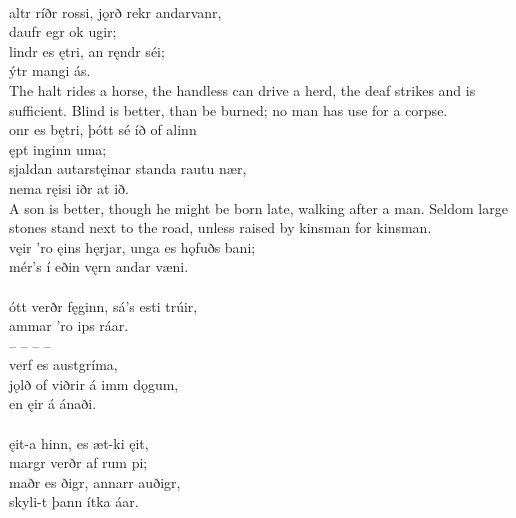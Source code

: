  \\

\bva {}altr ríðr rossi, \hld {}jǫrð rekr andarvanr, \\%
\ind daufr egr ok ugir; \\%
lindr es ętri, \hld an ręndr séi; \\%
\ind {}ýtr mangi ás.\\%

\bvb The halt rides a horse, the handless can drive a herd, the deaf strikes and is sufficient. Blind is better, than be burned; no man has use for a corpse. \\

\bva {}onr es bętri, \hld þótt sé íð of alinn \\%
\ind ępt inginn uma; \\%
sjaldan autarstęinar \hld standa rautu nær, \\%
\ind nema ręisi iðr at ið.\\%

\bvb A son is better, though he might be born late, walking after a man. Seldom large stones stand next to the road, unless raised by kinsman for kinsman. \\

\bva {}vęir 'ro ęins hęrjar, \hld {}unga es hǫfuðs bani; \\%
\ind mér's í eðin vęrn \hld {}andar væni.\\%

 \\

\bva {}ótt verðr fęginn, \hld sá's esti trúir, \\%
\ind {}ammar 'ro ips ráar. \\%
– – – – \\%
\ind {}verf es austgríma, \\%
jǫlð of viðrir \hld á imm dǫgum, \\%
\ind en ęir á ánaði.\\%

 \\

\bva {}ęit-a hinn, \hld es æt-ki ęit, \\%
\ind margr verðr af rum pi; \\%
maðr es ðigr, \hld annarr auðigr, \\%
\ind skyli-t þann ítka áar.\\%

